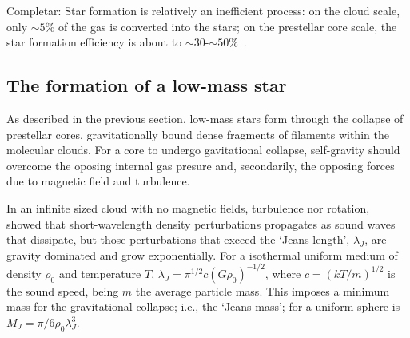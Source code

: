 \documentclass[12pt]{mythesis}
\begin{document}
Completar: Star formation is relatively an inefficient process: on the cloud scale, only $\sim 5\%$ of the gas is converted into the stars; on the prestellar core scale, the star formation efficiency is about to $\sim$30-$\sim50\%$~\citep{offner2014, chevance2023}.

\subsection{The formation of a low-mass star}

As described in the previous section, low-mass stars form through the collapse of prestellar cores, gravitationally bound dense fragments of filaments within the molecular clouds. For a core to undergo gavitational collapse, self-gravity should overcome the oposing internal gas presure and, secondarily, the opposing forces due to magnetic field and turbulence. 

In an infinite sized cloud with no magnetic fields, turbulence nor rotation,\ \citet{jeans1902} showed that short-wavelength density perturbations propagates as sound waves that dissipate, but those perturbations that exceed the `Jeans length', $\lambda_J$, are gravity dominated and grow exponentially. For a isothermal uniform medium of density $\rho_0$ and temperature $T$, $\lambda_J=\pi^{1/2}c\left(G\rho_0\right)^{-1/2}$, where $c=\left(kT/m\right)^{1/2}$ is the sound speed, being $m$ the average particle mass. This imposes a minimum mass for the gravitational collapse; i.e., the `Jeans mass'; for a uniform sphere is 
$M_J=\pi/6\rho_0\lambda_J^3$.
\end{document}
